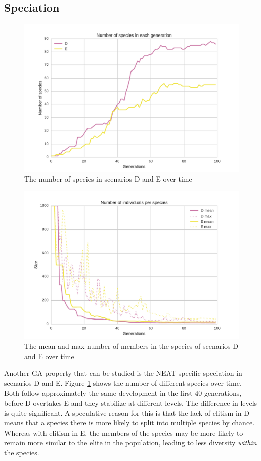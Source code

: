 \subsection{Speciation}
\begin{figure}
\centering
\includegraphics[width=\columnwidth]{fig/species}
\caption{The number of species in scenarios D and E over time}
\label{fig:species}
\end{figure}

\begin{figure}
\centering
\includegraphics[width=\columnwidth]{fig/species_size}
\caption{The mean and max number of members in the species of scenarios D and E over time}
\label{fig:species_size}
\end{figure}

Another GA property that can be studied is the NEAT-specific speciation in scenarios D and E.
Figure \ref{fig:species} shows the number of different species over time.
Both follow approximately the same development in the first 40 generations, before D overtakes E and they stabilize at different levels.
The difference in levels is quite significant.
A speculative reason for this is that the lack of elitism in D means that a species there is more likely to split into multiple species by chance.
Whereas with elitism in E, the members of the species may be more likely to remain more similar to the elite in the population, leading to less diversity \textit{within} the species.

